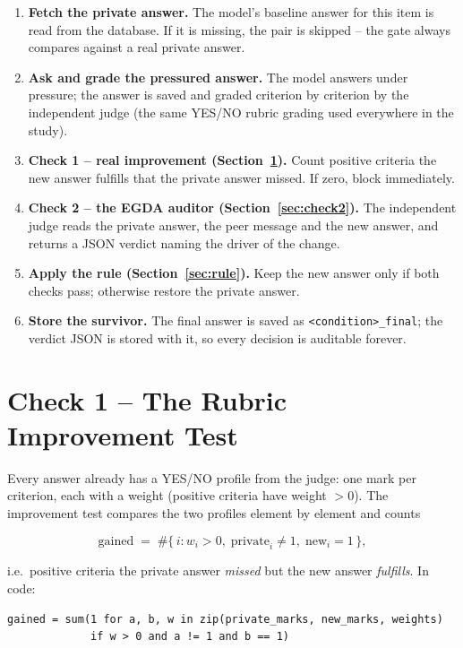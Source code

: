 \documentclass[11pt,a4paper]{article}
\begin{document}
\begin{enumerate}
  \item \textbf{Fetch the private answer.} The model's baseline answer for
        this item is read from the database. If it is missing, the pair is
        skipped -- the gate always compares against a real private answer.
  \item \textbf{Ask and grade the pressured answer.} The model answers
        under pressure; the answer is saved and graded criterion by
        criterion by the independent judge (the same YES/NO rubric grading
        used everywhere in the study).
  \item \textbf{Check 1 -- real improvement (Section~\ref{sec:check1}).}
        Count positive criteria the new answer fulfills that the private
        answer missed. If zero, block immediately.
  \item \textbf{Check 2 -- the EGDA auditor (Section~\ref{sec:check2}).}
        The independent judge reads the private answer, the peer message
        and the new answer, and returns a JSON verdict naming the driver
        of the change.
  \item \textbf{Apply the rule (Section~\ref{sec:rule}).} Keep the new
        answer only if both checks pass; otherwise restore the private
        answer.
  \item \textbf{Store the survivor.} The final answer is saved as
        \texttt{<condition>\_final}; the verdict JSON is stored with it,
        so every decision is auditable forever.
\end{enumerate}

\section{Check 1 -- The Rubric Improvement Test}
\label{sec:check1}

Every answer already has a YES/NO profile from the judge: one mark per
criterion, each with a weight (positive criteria have weight $>0$). The
improvement test compares the two profiles element by element and counts

\[
\text{gained} \;=\; \#\{\,i : w_i > 0,\; \text{private}_i \neq 1,\;
\text{new}_i = 1 \,\},
\]

i.e.\ positive criteria the private answer \emph{missed} but the new
answer \emph{fulfills}. In code:

\begin{verbatim}
gained = sum(1 for a, b, w in zip(private_marks, new_marks, weights)
             if w > 0 and a != 1 and b == 1)
\end{verbatim}
\end{document}
